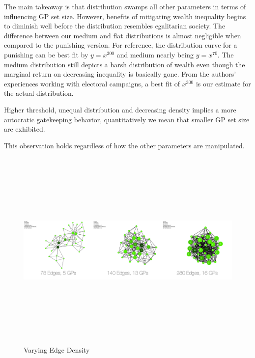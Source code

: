 \documentclass[a4paper]{article}
\begin{document}
The main takeaway is that distribution swamps all other parameters in terms of influencing GP set size. However, benefits of mitigating wealth inequality begins to diminish well before the distribution resembles egalitarian society. The difference between our medium and flat distributions is almost negligible when compared to the punishing version. For reference, the distribution curve for a punishing can be best fit by $y=x^300$ and medium nearly being $y=x^70$. The medium distribution still depicts a harsh distribution of wealth even though the marginal return on decreasing inequality is basically gone. From the authors' experiences working with electoral campaigns, a best fit of $x^300$ is our estimate for the actual distribution.

Higher threshold, unequal distribution and decreasing density implies a more autocratic gatekeeping behavior, quantitatively we mean that smaller GP set size are exhibited.

This observation holds regardless of how the other parameters are manipulated. 

\begin{figure}[ht!]
\centering
\includegraphics[width=250mm, height = 100mm,angle = 90]{Density.jpg}
\caption{Varying Edge Density \label{de}}
\end{figure}
\end{document}
